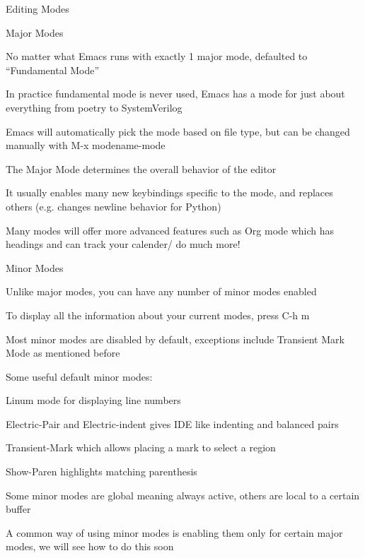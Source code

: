 \documentclass[presentation]{beamer}
\begin{document}
\begin{frame}[label=sec-3]{Editing Modes}
\begin{block}{Major Modes}
\begin{block}{No matter what Emacs runs with exactly 1 major mode, defaulted to ``Fundamental Mode''}
\begin{block}{In practice fundamental mode is never used, Emacs has a mode for just about everything from poetry to SystemVerilog}
\end{block}
\begin{block}{Emacs will automatically pick the mode based on file type, but can be changed manually with M-x modename-mode}
\end{block}
\end{block}
\begin{block}{The Major Mode determines the overall behavior of the editor}
\begin{block}{It usually enables many new keybindings specific to the mode, and replaces others (e.g. changes newline behavior for Python)}
\end{block}
\begin{block}{Many modes will offer more advanced features such as Org mode which has headings and can track your calender/ do much more!}
\end{block}
\end{block}
\end{block}
\begin{block}{Minor Modes}
\begin{block}{Unlike major modes, you can have any number of minor modes enabled}
\end{block}
\begin{block}{To display all the information about your current modes, press C-h m}
\end{block}
\begin{block}{Most minor modes are disabled by default, exceptions include Transient Mark Mode as mentioned before}
\end{block}
\begin{block}{Some useful default minor modes:}
\begin{block}{Linum mode for displaying line numbers}
\end{block}
\begin{block}{Electric-Pair and Electric-indent gives IDE like indenting and balanced pairs}
\end{block}
\begin{block}{Transient-Mark which allows placing a mark to select a region}
\end{block}
\begin{block}{Show-Paren highlights matching parenthesis}
\end{block}
\end{block}
\begin{block}{Some minor modes are global meaning always active, others are local to a certain buffer}
\end{block}
\begin{block}{A common way of using minor modes is enabling them only for certain major modes, we will see how to do this soon}
\end{block}
\end{block}
\end{frame}
\end{document}
